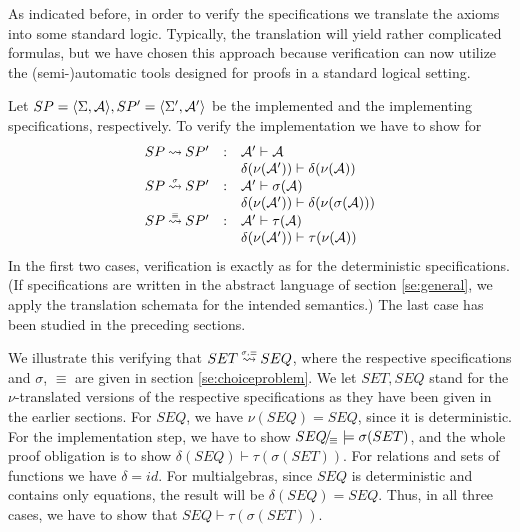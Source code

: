 As indicated before, in order to verify the specifications we translate the axioms into some standard logic. Typically, the translation will yield rather complicated formulas, but we have chosen this approach because verification can now utilize the (semi-)automatic tools designed for proofs in a standard logical setting.

Let $SP=\langle\Sigma,{\cal A}\rangle, SP'=\langle\Sigma',{\cal A}'\rangle$ be the implemented and the implementing specifications, respectively. To verify the implementation we have to show for
\begin{equation}\label{eq:oblig}
\begin{array}{rcl}
SP\mathbin{\leadsto} SP' & : &{\cal A}'\vdash{\cal A} \\
& & \delta(\nu({\cal A}'))\vdash \delta(\nu({\cal A})) \\ SP\mathbin{\stackrel{\scriptscriptstyle \sigma}{\mathbin{\leadsto}}} SP' & : & {\cal A}'\vdash \sigma({\cal A}) \\ 
& & \delta(\nu({\cal A}'))\vdash \delta(\nu(\sigma({\cal A}))) \\ SP\mathbin{\stackrel{\scriptscriptstyle \equiv}{\mathbin{\leadsto}}} SP' & : & {\cal A}'\vdash \tau({\cal A}) \\ 
& & \delta(\nu({\cal A}'))\vdash \tau(\nu({\cal A})) \\ \end{array}
\end{equation}
In the first two cases, verification is exactly as for the deterministic specifications. (If specifications are written in the abstract language of section \ref{se:general}, we apply the translation schemata for the intended semantics.) The last case has been studied in the preceding sections. 

We illustrate this verifying that $SET\mathbin{\stackrel{\scriptscriptstyle \sigma,\equiv}{\mathbin{\leadsto}}}SEQ$, where the respective specifications and $\sigma$, $\equiv$ are given in section \ref{se:choiceproblem}. We let $SET,SEQ$ stand for the $\nu$-translated versions of the respective specifications as they have been given in the earlier sections. For $SEQ$, we have $\nu(SEQ)=SEQ$, since it is deterministic.
For the implementation step, we have to show $SEQ\!{\textstyle /}\!_\equiv\models \sigma(SET)$, and the whole proof obligation is to show $\delta(SEQ)\vdash \tau(\sigma(SET)).$ For relations and sets of functions we have $\delta=id$. For multialgebras, since $SEQ$ is deterministic and contains only equations, the result will be $\delta(SEQ)=SEQ$.
Thus, in all three cases, we have to show that $SEQ\vdash\tau(\sigma(SET)).$ 

